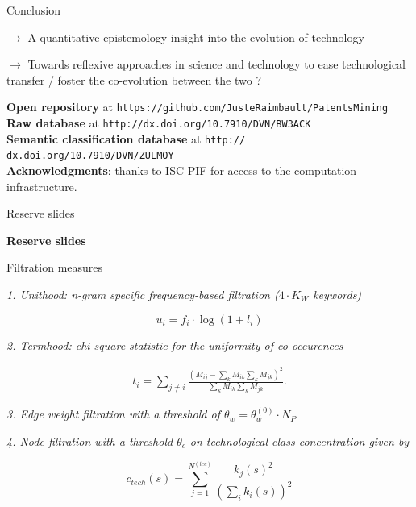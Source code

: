 \documentclass{beamer}
\begin{document}
\begin{frame}{Conclusion}

$\rightarrow$ A quantitative epistemology insight into the evolution of technology

\medskip

$\rightarrow$ Towards reflexive approaches in science and technology to ease technological transfer / foster the co-evolution between the two ?


\bigskip
\bigskip

\textbf{Open repository} at \texttt{https://github.com/JusteRaimbault/PatentsMining}\\\medskip
\textbf{Raw database} at \texttt{http://dx.doi.org/10.7910/DVN/BW3ACK}\\\medskip 
\textbf{Semantic classification database} at  \texttt{http:// dx.doi.org/10.7910/DVN/ZULMOY}\\\medskip
\textbf{Acknowledgments}: thanks to ISC-PIF for access to the computation infrastructure.

\end{frame}


\begin{frame}{Reserve slides}
    
    \centering
    \Huge
    \textbf{Reserve slides}
    
\end{frame}

\begin{frame}{Filtration measures}

\label{slide:filtration}
\hyperlink{slide:relevance}{}



    
    \textit{1. Unithood: n-gram specific frequency-based filtration ($4\cdot K_W$ keywords)}
    
	\[
	u_i = f_i\cdot \log{(1 + l_i)}
	\]
    
    \medskip
    
    \textit{2. Termhood: chi-square statistic for the uniformity of co-occurences}
    
    \medskip
    
    \begin{eqnarray}
\label{termhood}
t_i = \sum_{j\neq i}\frac{\left( M_{ij} - \sum_{k}M_{ik} \sum_{k} M_{jk}\right)^2}{\sum_{k}M_{ik} \sum_{k} M_{jk}}.
\end{eqnarray}

    \medskip

	\textit{3. Edge weight filtration with a threshold of $\theta_w = \theta_w^{(0)}\cdot N_P$}
	
	\medskip

	\textit{4. Node filtration with a threshold $\theta_c$ on technological class concentration given by}
    
    \[
    c_{tech}(s) = \displaystyle \sum_{j=1}^{N^{(tec)}} \frac{k_j(s)^2}{ \left(\sum_i k_i(s)\right)^2}
    \]
    
    
\end{frame}
\end{document}
